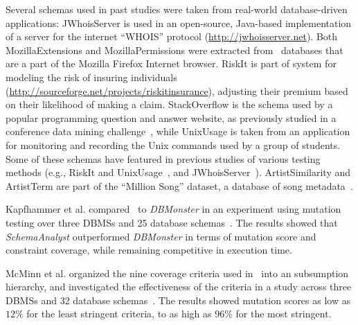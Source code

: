 Several schemas used in past studies were taken from real-world database-driven applications: {JWhoisServer} is used in
an open-source, Java-based implementation of a server for the internet ``WHOIS'' protocol
(\url{http://jwhoisserver.net}).  Both {MozillaExtensions} and {MozillaPermissions} were extracted from
\SQLite~databases that are a part of the Mozilla Firefox Internet browser.  {RiskIt} is part of system for modeling the
risk of insuring individuals (\url{http://sourceforge.net/projects/riskitinsurance}), adjusting their premium based on
their likelihood of making a claim.  {StackOverflow} is the schema used by a popular programming question and answer
website, as previously studied in a conference data mining challenge~\cite{MSRChallenge2013}, while {UnixUsage} is taken
from an application for monitoring and recording the Unix commands used by a group of students.  Some of these schemas
have featured in previous studies of various testing methods (e.g., {RiskIt} and {UnixUsage}~\cite{Pan2011b}, and
{JWhoisServer}~\cite{Cobb2011}).  {ArtistSimilarity} and {ArtistTerm} are part of the ``Million Song'' dataset, a
database of song metadata~\cite{Bertin-Mahieux2011}.



Kapfhammer et al. compared \sa~to \textit{DBMonster} in an experiment using mutation testing over
three DBMSs and 25 database schemas~\cite{kapfhammer2013search}. The results showed that \textit{SchemaAnalyst}
outperformed \textit{DBMonster} in terms of mutation score and constraint coverage, while remaining competitive in
execution time.

McMinn et al. organized the nine coverage criteria used in \sa~into an subsumption hierarchy, and
investigated the effectiveness of the criteria in a study across three DBMSs and 32 database
schemas~\cite{mcminn2015effectiveness}.  The results showed mutation scores as low as $12\%$ for the least stringent
criteria, to as high as $96\%$ for the most stringent.

